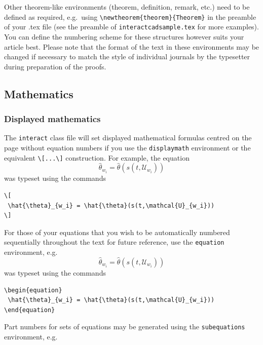 \documentclass[]{interact}
\theoremstyle{plain}%
\theoremstyle{definition}
\theoremstyle{remark}
\begin{document}
Other theorem-like environments (theorem, definition, remark, etc.) need
to be defined as required, e.g.~using
\texttt{\textbackslash{}newtheorem\{theorem\}\{Theorem\}} in the
preamble of your .tex file (see the preamble of
\texttt{interactcadsample.tex} for more examples). You can define the
numbering scheme for these structures however suits your article best.
Please note that the format of the text in these environments may be
changed if necessary to match the style of individual journals by the
typesetter during preparation of the proofs.

\hypertarget{mathematics}{%
\subsection{Mathematics}\label{mathematics}}

\hypertarget{displayed-mathematics}{%
\subsubsection{Displayed mathematics}\label{displayed-mathematics}}

The \texttt{interact} class file will set displayed mathematical
formulas centred on the page without equation numbers if you use the
\texttt{displaymath} environment or the equivalent
\texttt{\textbackslash{}{[}...\textbackslash{}{]}} construction. For
example, the equation \[
 \hat{\theta}_{w_i} = \hat{\theta}(s(t,\mathcal{U}_{w_i}))
\] was typeset using the commands

\begin{verbatim}
\[
 \hat{\theta}_{w_i} = \hat{\theta}(s(t,\mathcal{U}_{w_i}))
\]
\end{verbatim}

For those of your equations that you wish to be automatically numbered
sequentially throughout the text for future reference, use the
\texttt{equation} environment, e.g. \begin{equation}
 \hat{\theta}_{w_i} = \hat{\theta}(s(t,\mathcal{U}_{w_i}))
\end{equation} was typeset using the commands

\begin{verbatim}
\begin{equation}
 \hat{\theta}_{w_i} = \hat{\theta}(s(t,\mathcal{U}_{w_i}))
\end{equation}
\end{verbatim}

Part numbers for sets of equations may be generated using the
\texttt{subequations} environment, e.g.
\end{document}
